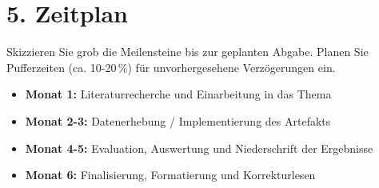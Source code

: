 \section*{5. Zeitplan}
Skizzieren Sie grob die Meilensteine bis zur geplanten Abgabe. Planen Sie Pufferzeiten (ca. 10-20\,\%) für unvorhergesehene Verzögerungen ein.
\begin{itemize}
    \item \textbf{Monat 1:} Literaturrecherche und Einarbeitung in das Thema
    \item \textbf{Monat 2-3:} Datenerhebung / Implementierung des Artefakts
    \item \textbf{Monat 4-5:} Evaluation, Auswertung und Niederschrift der Ergebnisse
    \item \textbf{Monat 6:} Finalisierung, Formatierung und Korrekturlesen
\end{itemize}

\newpage
\printbibliography[title={Vorläufiges Literaturverzeichnis}]


